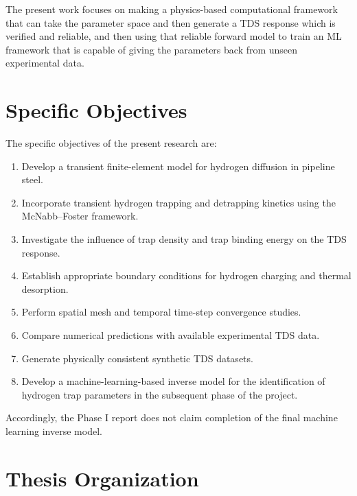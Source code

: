 \documentclass[a4paper,12pt,oneside]{report}
\begin{document}
The present work focuses on making a physics-based computational framework that can take the parameter space and then generate a TDS response which is verified and reliable, and then using that reliable forward model to train an ML framework that is capable of giving the parameters back from unseen experimental data.


\section{Specific Objectives}

The specific objectives of the present research are:

\begin{enumerate}
    \item Develop a transient finite-element model for hydrogen diffusion in pipeline steel.
    \item Incorporate transient hydrogen trapping and detrapping kinetics using the McNabb--Foster framework.
    \item Investigate the influence of trap density and trap binding energy on the TDS response.
    \item Establish appropriate boundary conditions for hydrogen charging and thermal desorption.
    \item Perform spatial mesh and temporal time-step convergence studies.
    \item Compare numerical predictions with available experimental TDS data.
    \item Generate physically consistent synthetic TDS datasets.
    \item Develop a machine-learning-based inverse model for the identification of hydrogen trap parameters in the subsequent phase of the project.
\end{enumerate}

Accordingly, the Phase I report does not claim completion of the final machine learning inverse model.


\section{Thesis Organization}
\end{document}
